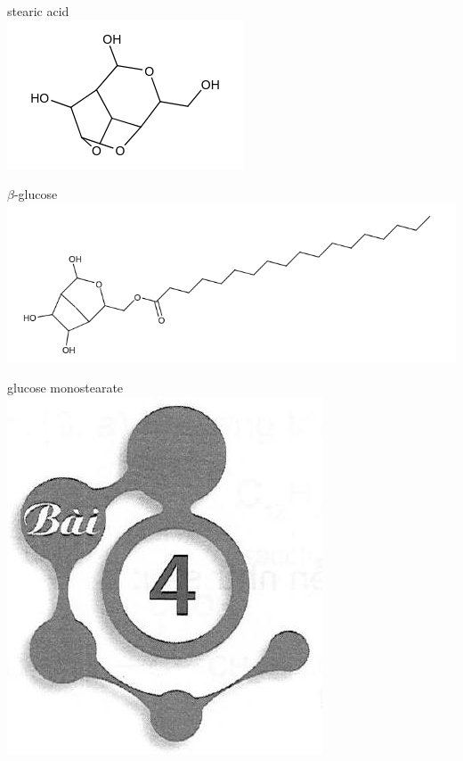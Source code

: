 \documentclass[10pt]{article}
\begin{document}
stearic acid\\
\includegraphics{smile-e6f83f2daa00e9a27b89bd1c91394c15d3e29aab}

$\beta$-glucose\\
\includegraphics{smile-3fdd8a5eeb1e9f07e68882691b24ff372834fdca}

glucose monostearate\\
\includegraphics[max width=\textwidth, center]{2025_10_23_b4e16b74380d0f7e7700g-028}
\end{document}
